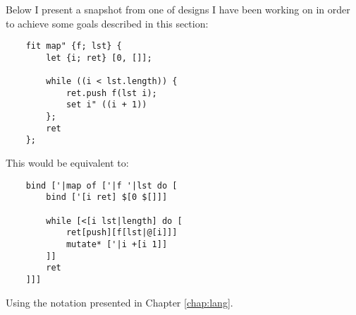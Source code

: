 Below I present a snapshot from one of designs I have been working on in order to achieve some goals described in this section:
\begin{lstlisting}
    fit map" {f; lst} {
    	let {i; ret} [0, []];
    	
    	while ((i < lst.length)) {
    		ret.push f(lst i);
    		set i" ((i + 1))
    	};
    	ret
    };
\end{lstlisting}

This would be equivalent to:
\begin{lstlisting}
    bind ['|map of ['|f '|lst do [
    	bind ['[i ret] $[0 $[]]]
    	
    	while [<[i lst|length] do [
    		ret[push][f[lst|@[i]]] 
    		mutate* ['|i +[i 1]]
    	]]
    	ret
    ]]]
\end{lstlisting}

Using the notation presented in Chapter \ref{chap:lang}.


